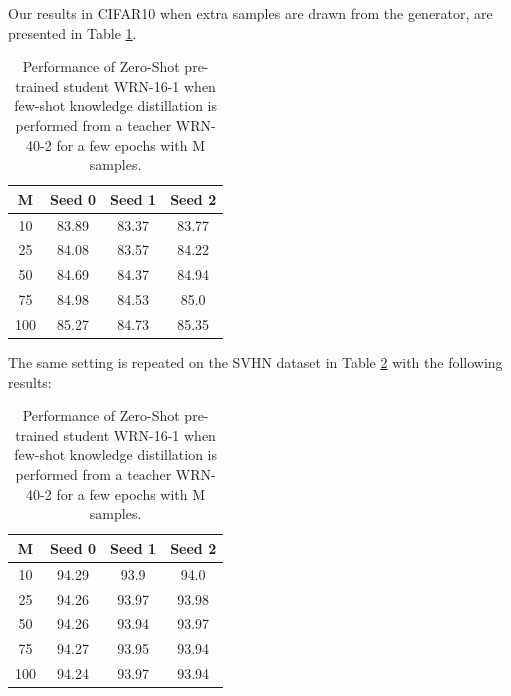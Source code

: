 Our results in CIFAR10 when extra samples are drawn from the generator, are presented in Table \ref{tab:zeroShot_KDatt_cifar}.

\begin{table}[!h]
    \centering
    \begin{tabular}{c|ccc}
    \toprule
    \toprule
         \textbf{M} & \textbf{Seed 0} & \textbf{Seed 1} & \textbf{Seed 2} \\
         \midrule
         10 & 83.89 & 83.37 & 83.77 \\
         25 & 84.08 & 83.57 & 84.22 \\
         50 & 84.69 & 84.37 & 84.94 \\
         75 & 84.98 & 84.53 & 85.0  \\
         100 & 85.27 & 84.73 & 85.35\\
         \bottomrule
         \bottomrule
    \end{tabular}
    \vspace{0.25cm}
    \caption{Performance of Zero-Shot pre-trained student WRN-16-1 when few-shot knowledge distillation is performed from a teacher WRN-40-2 for a few epochs with M samples.}
    \label{tab:zeroShot_KDatt_cifar}
\end{table}

The same setting is repeated on the SVHN dataset in Table \ref{tab:zeroShot_KDatt_svhn} with the following results:

\begin{table}[!h]
    \centering
    \begin{tabular}{c|ccc}
    \toprule
    \toprule
         \textbf{M} & \textbf{Seed 0} & \textbf{Seed 1} & \textbf{Seed 2} \\
         \midrule
         10 & 94.29 & 93.9 & 94.0   \\
         25 & 94.26 & 93.97 & 93.98 \\
         50 & 94.26 & 93.94 & 93.97 \\
         75 & 94.27 & 93.95 & 93.94 \\
         100 & 94.24 & 93.97 & 93.94 \\
         \bottomrule
         \bottomrule
    \end{tabular}
    \vspace{0.25cm}
    \caption{Performance of Zero-Shot pre-trained student WRN-16-1 when few-shot knowledge distillation is performed from a teacher WRN-40-2 for a few epochs with M samples.}
    \label{tab:zeroShot_KDatt_svhn}
\end{table}

